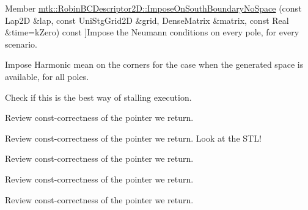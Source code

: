 \begin{DoxyRefList}
\hypertarget{todo__todo000029}{}%
Member \hyperlink{classmtk_1_1RobinBCDescriptor2D_a82159bcca93555114532c5fa4d0fb3db}{mtk\+:\+:Robin\+B\+C\+Descriptor2\+D\+:\+:Impose\+On\+South\+Boundary\+No\+Space} (const Lap2\+D \&lap, const Uni\+Stg\+Grid2\+D \&grid, Dense\+Matrix \&matrix, const Real \&time=k\+Zero) const ]Impose the Neumann conditions on every pole, for every scenario.  
\item[\label{todo__todo000030}%
\hypertarget{todo__todo000030}{}%
Member \hyperlink{classmtk_1_1RobinBCDescriptor2D_a2f99cdd8bda2bc46cf259bb96ef4bd49}{mtk\+:\+:Robin\+B\+C\+Descriptor2\+D\+:\+:Impose\+On\+South\+Boundary\+With\+Space} (const Lap2\+D \&lap, const Uni\+Stg\+Grid2\+D \&grid, Dense\+Matrix \&matrix, const Real \&time=k\+Zero) const ]Impose Harmonic mean on the corners for the case when the generated space is available, for all poles.  
\item[\label{todo__todo000032}%
\hypertarget{todo__todo000032}{}%
Member \hyperlink{classmtk_1_1Tools_a332324c6f25e66be9dff48c5987a3b9f}{mtk\+:\+:Tools\+:\+:Prevent} (const bool complement, const char $\ast$const fname, int lineno, const char $\ast$const fxname) noexcept]Check if this is the best way of stalling execution.  
\item[\label{todo__todo000006}%
\hypertarget{todo__todo000006}{}%
Member \hyperlink{classmtk_1_1UniStgGrid1D_aa1999580cb98c19950e951510871cc90}{mtk\+:\+:Uni\+Stg\+Grid1\+D\+:\+:discrete\+\_\+domain\+\_\+x} () const ]Review const-\/correctness of the pointer we return.  
\item[\label{todo__todo000007}%
\hypertarget{todo__todo000007}{}%
Member \hyperlink{classmtk_1_1UniStgGrid1D_ab9c3f9ee2ac76a351b01e4abfede4d19}{mtk\+:\+:Uni\+Stg\+Grid1\+D\+:\+:discrete\+\_\+field} ()]Review const-\/correctness of the pointer we return. Look at the S\+T\+L!  
\item[\label{todo__todo000010}%
\hypertarget{todo__todo000010}{}%
Member \hyperlink{classmtk_1_1UniStgGrid2D_ab2f70cf5cd0a2d5486992d9f2f8baa4a}{mtk\+:\+:Uni\+Stg\+Grid2\+D\+:\+:discrete\+\_\+domain\+\_\+x} () const ]Review const-\/correctness of the pointer we return.  
\item[\label{todo__todo000011}%
\hypertarget{todo__todo000011}{}%
Member \hyperlink{classmtk_1_1UniStgGrid2D_ac33a58d65105550dcf6f6b92b48b5105}{mtk\+:\+:Uni\+Stg\+Grid2\+D\+:\+:discrete\+\_\+domain\+\_\+y} () const ]Review const-\/correctness of the pointer we return.  
\item[\label{todo__todo000014}%
\hypertarget{todo__todo000014}{}%
Member \hyperlink{classmtk_1_1UniStgGrid3D_a2365ddd57304c4036a07844b952b31ad}{mtk\+:\+:Uni\+Stg\+Grid3\+D\+:\+:discrete\+\_\+domain\+\_\+x} () const ]Review const-\/correctness of the pointer we return.  

\end{DoxyRefList}
